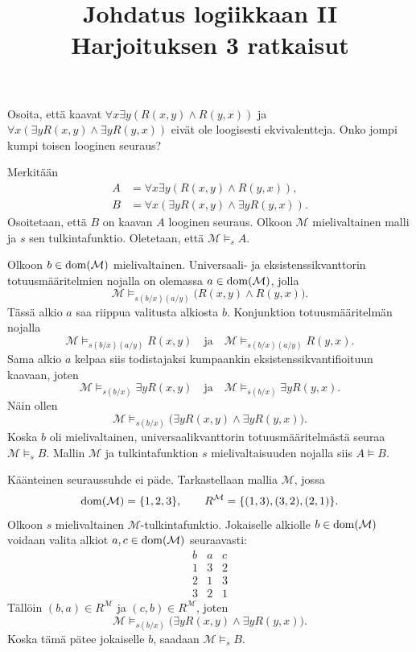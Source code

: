 \documentclass[11pt,a4paper]{amsart}
\title{Johdatus logiikkaan II\\Harjoituksen 3 ratkaisut}
\author{}
\date{}
\begin{document}

\begin{exercise}
  Osoita, että kaavat \(\forall x\exists y(R(x,y) \land R(y,x))\) ja
  \(\forall x(\exists yR(x,y) \land \exists yR(y,x))\) eivät ole loogisesti
  ekvivalentteja. Onko jompi kumpi toisen looginen seuraus?
\end{exercise}

\begin{solution}
  Merkitään
  \[
    \begin{aligned}
      A &= \forall x\exists y(R(x,y) \land R(y,x)), \\
      B &= \forall x(\exists yR(x,y) \land \exists yR(y,x)).
    \end{aligned}
  \]
  Osoitetaan, että \(B\) on kaavan \(A\) looginen seuraus.
  Olkoon \(\mathcal M\) mielivaltainen malli ja \(s\) sen tulkintafunktio.
  Oletetaan, että \(\mathcal M \models_s A\).

  Olkoon \(b \in \operatorname{dom}(\mathcal M)\) mielivaltainen. Universaali- ja
  eksistenssikvanttorin totuusmääritelmien nojalla on olemassa
  \(a \in \operatorname{dom}(\mathcal M)\), jolla
  \[
    \mathcal M \models_{s(b/x)(a/y)}
    \bigl(R(x,y) \land R(y,x)\bigr).
  \]
  Tässä alkio \(a\) saa riippua valitusta alkiosta \(b\).
  Konjunktion totuusmääritelmän nojalla
  \[
    \mathcal M \models_{s(b/x)(a/y)} R(x,y)
    \quad\text{ja}\quad
    \mathcal M \models_{s(b/x)(a/y)} R(y,x).
  \]
  Sama alkio \(a\) kelpaa siis todistajaksi kumpaankin
  eksistenssikvantifioituun kaavaan, joten
  \[
    \mathcal M \models_{s(b/x)} \exists yR(x,y)
    \quad\text{ja}\quad
    \mathcal M \models_{s(b/x)} \exists yR(y,x).
  \]
  Näin ollen
  \[
    \mathcal M \models_{s(b/x)}
    \bigl(\exists yR(x,y) \land \exists yR(y,x)\bigr).
  \]
  Koska \(b\) oli mielivaltainen, universaalikvanttorin totuusmääritelmästä
  seuraa \(\mathcal M \models_s B\). Mallin \(\mathcal M\) ja
  tulkintafunktion \(s\) mielivaltaisuuden nojalla siis \(A \models B\).

  Käänteinen seuraussuhde ei päde. Tarkastellaan mallia \(\mathcal M\), jossa
  \[
    \operatorname{dom}(\mathcal M) = \{1,2,3\},
    \qquad
    R^{\mathcal M} = \{(1,3),(3,2),(2,1)\}.
  \]
  Olkoon \(s\) mielivaltainen \(\mathcal M\)-tulkintafunktio.
  Jokaiselle alkiolle \(b \in \operatorname{dom}(\mathcal M)\) voidaan valita alkiot
  \(a,c \in \operatorname{dom}(\mathcal M)\) seuraavasti:
  \[
    \begin{array}{c|cc}
      b & a & c \\
      \hline
      1 & 3 & 2 \\
      2 & 1 & 3 \\
      3 & 2 & 1
    \end{array}
  \]
  Tällöin \((b,a) \in R^{\mathcal M}\) ja \((c,b) \in R^{\mathcal M}\),
  joten
  \[
    \mathcal M \models_{s(b/x)}
    \bigl(\exists yR(x,y) \land \exists yR(y,x)\bigr).
  \]
  Koska tämä pätee jokaiselle \(b\), saadaan \(\mathcal M \models_s B\).


\end{solution}
\end{document}
